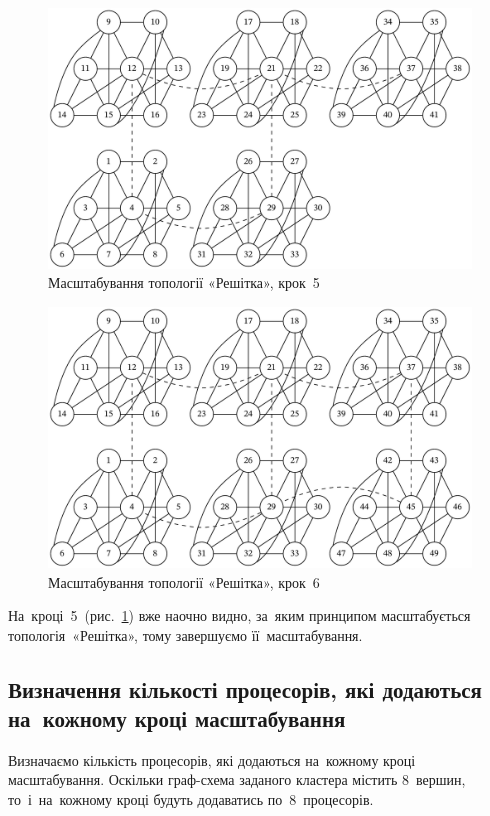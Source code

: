 \documentclass[
	a4paper,
	oneside,
	BCOR = 10mm,
	DIV = 12,
	12pt,
	headings = normal,
]{scrartcl}
\begin{document}
				\begin{figure}[!htbp]
					\centering
					\includegraphics[height=12\baselineskip]{./assets/cluster-08-05-grid-s05.pdf}
					\caption{Масштабування топології «Решітка», крок~5}
					\label{fig:cluster-08-05-grid-s05}
				\end{figure}

				\begin{figure}[!htbp]
					\centering
					\includegraphics[height=12\baselineskip]{./assets/cluster-08-05-grid-s06.pdf}
					\caption{Масштабування топології «Решітка», крок~6}
					\label{fig:cluster-08-05-grid-s06}
				\end{figure}

				На~кроці~5~(рис.~\ref{fig:cluster-08-05-grid-s05}) вже наочно видно, за~яким принципом масштабується топологія~«Решітка», тому завершуємо її~масштабування.

		\subsection{Визначення кількості процесорів, які додаються на~кожному кроці масштабування}
			Визначаємо кількість процесорів, які додаються на~кожному кроці масштабування. Оскільки граф-схема заданого кластера містить 8~вершин, то~і~на~кожному кроці будуть додаватись по~8~процесорів.
\end{document}
